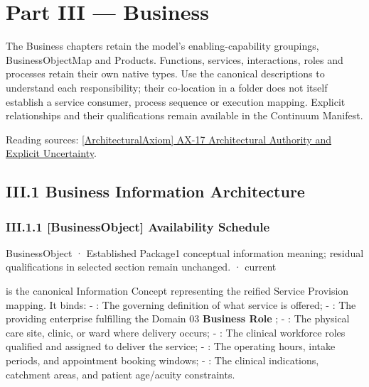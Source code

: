 \part*{Part III — Business}
\label{navigation:III}
The Business chapters retain the model's enabling-capability groupings, BusinessObjectMap and Products. Functions, services, interactions, roles and processes retain their own native types. Use the canonical descriptions to understand each responsibility; their co-location in a folder does not itself establish a service consumer, process sequence or execution mapping. Explicit relationships and their qualifications remain available in the Continuum Manifest.

{\small Reading sources: \hyperref[element:8882573df7ce43c6bc0f66da0a676139]{[ArchitecturalAxiom] AX-17 Architectural Authority and Explicit Uncertainty}.}\par
\chapter*{III.1 Business Information Architecture}
\label{navigation:III.1}

\section*{III.1.1 [BusinessObject] Availability Schedule}
\label{navigation:III.1.1}

\label{element:96638431fc39486d879d080768a68fe9}
{\small BusinessObject · Established Package1 conceptual information meaning; residual qualifications in selected section remain unchanged. · current}\par

\texttt{} is the canonical Information Concept representing the reified Service Provision mapping. It binds:
- \textbf{\texttt{}}: The governing definition of what service is offered;
- \textbf{\texttt{}}: The providing enterprise fulfilling the Domain 03 \textbf{Business Role} \texttt{};
- \textbf{\texttt{}}: The physical care site, clinic, or ward where delivery occurs;
- \textbf{\texttt{}}: The clinical workforce roles qualified and assigned to deliver the service;
- \textbf{\texttt{}}: The operating hours, intake periods, and appointment booking windows;
- \textbf{\texttt{}}: The clinical indications, catchment areas, and patient age/acuity constraints.



